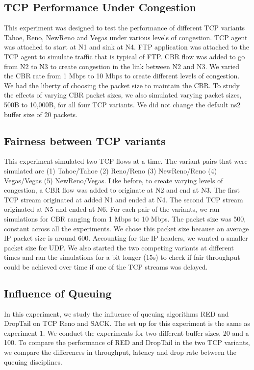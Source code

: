  \subsection{TCP Performance Under Congestion}
This experiment was designed to test the performance of different TCP variants Tahoe, Reno, NewReno and Vegas under various levels of congestion. TCP agent was attached to start at N1 and sink at N4. FTP application was attached to the TCP agent to simulate traffic that is typical of FTP. CBR flow was added to go from N2 to N3 to create congestion in the link between N2 and N3. We varied the CBR rate from 1 Mbps to 10 Mbps to create different levels of congestion. We had the liberty of choosing the packet size to maintain the CBR. To study the effects of varying CBR packet sizes, we also simulated varying packet sizes, 500B to 10,000B, for all four TCP variants. We did not change the default ns2 buffer size of 20 packets.  
 \subsection{Fairness between TCP variants}
This experiment simulated two TCP flows at a time. The variant pairs that were simulated are (1) Tahoe/Tahoe (2) Reno/Reno (3) NewReno/Reno (4) Vegas/Vegas (5) NewReno/Vegas. Like before, to create varying levels of congestion, a CBR flow was added to originate at N2 and end at N3. The first TCP stream originated at added N1 and ended at N4. The second TCP stream originated at N5 and ended at N6. For each pair of the variants, we ran simulations for CBR ranging from 1 Mbps to 10 Mbps. The packet size was 500, constant across all the experiments. We chose this packet size because an average IP packet size is around 600. Accounting for the IP headers, we wanted a smaller packet size for UDP. 
We also started the two competing variants at different times and ran the simulations for a bit longer (15s) to check if fair throughput could be achieved over time if one of the TCP streams was delayed.
 \subsection{Influence of Queuing}
In this experiment, we study the influence of queuing algorithms RED and DropTail on TCP Reno and SACK. The set up for this experiment is the same as experiment 1. We conduct the experiments for two different buffer sizes, 20 and a 100. To compare the performance of RED and DropTail in the two TCP variants, we compare the differences in throughput, latency and drop rate between the queuing disciplines. 